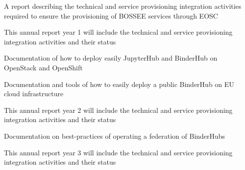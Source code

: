 \begin{workpackage}
\begin{wpdescription}
\end{wpdescription}

\begin{tasklist}
% 



\end{tasklist}

\begin{wpdelivs}
    \begin{wpdeliv}[due=6,miles=community,id=eosc-annual-report,dissem=PU,nature=R,lead=EGI]
    {A report describing the technical and service provisioning integration activities required to ensure the provisioning of BOSSEE services through EOSC}
  \end{wpdeliv}
    \begin{wpdeliv}[due=12,miles=community,id=eosc-annual-report-1,dissem=PU,nature=R,lead=EGI]
    {This annual report year 1 will include the technical and service provisioning integration activities and their status}
  \end{wpdeliv}
  \begin{wpdeliv}[due=18,miles=startup,id=openstack-openshift-documentation,dissem=PU,nature=R,lead=EP]
    {Documentation of how to deploy easily JupyterHub and BinderHub on OpenStack and OpenShift}
  \end{wpdeliv}
  \begin{wpdeliv}[due=24,miles=prototype,id=eu-binder-instance,dissem=PU,nature=R,lead=SRL]
    {Documentation and tools of how to easily deploy a public BinderHub on EU
    cloud infrastructure}
  \end{wpdeliv}
  \begin{wpdeliv}[due=24,miles=community,id=eosc-annual-report-2,dissem=PU,nature=R,lead=EGI]
    {This annual report year 2 will include the technical and service provisioning integration activities and their status}
  \end{wpdeliv}
  \begin{wpdeliv}[due=36,miles=community,id=binder-federation,dissem=PU,nature=R,lead=SRL]
    {Documentation on best-practices of operating a federation of BinderHubs}
  \end{wpdeliv}
  \begin{wpdeliv}[due=36,miles=community,id=eosc-annual-report-3,dissem=PU,nature=R,lead=EGI]
    {This annual report year 3 will include the technical and service provisioning integration activities and their status}
  \end{wpdeliv}
\end{wpdelivs}
\end{workpackage}

